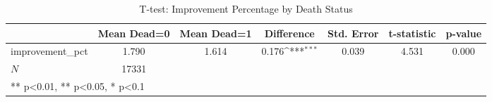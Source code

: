 \begin{table}[htbp]\centering
\def\sym#1{\ifmmode^{#1}\else\(^{#1}\)\fi}
\caption{T-test: Improvement Percentage by Death Status}
\begin{tabular}{l*{1}{cccccc}}
\hline\hline
            & Mean Dead=0& Mean Dead=1&  Difference         &  Std. Error& t-statistic&     p-value\\
\hline
improvement\_pct&       1.790&       1.614&       0.176\sym{***}&       0.039&       4.531&       0.000\\
\hline
\(N\)       &       17331&            &                     &            &            &            \\
\hline\hline
\multicolumn{7}{l}{\footnotesize *** p<0.01, ** p<0.05, * p<0.1}\\
\end{tabular}
\end{table}
